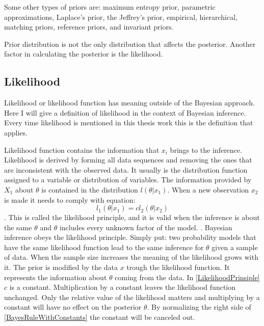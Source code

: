 Some other types of priors are: maximum entropy prior, parametric approximations, Laplace’s prior, the Jeffrey's prior, empirical, hierarchical, matching priors, reference priors, and invariant priors. \cite{Robert2007TheBC}

Prior distribution is not the only distribution that affects the posterior. Another factor in calculating the posterior is the likelihood.

\subsection{Likelihood}\label{Likelihood}
Likelihood or likelihood function has meaning outside of the Bayesian approach. Here I will give a definition of likelihood in the context of Bayesian inference. Every time likelihood is mentioned in this thesis work this is the definition that applies. 

Likelihood function contains the information that $x_i$ brings to the inference. \cite{Robert2007TheBC} Likelihood is derived by forming all data sequences and removing the ones that are inconsistent with the observed data. It usually is the distribution function assigned to a variable or distribution of variables. \cite{Mcelreath2015StatisticalRA} The information provided by $X_1$ about $\theta$ is contained in the distribution $l(\theta|x_1)$. When a new observation $x_2$ is made it needs to comply with equation:
\begin{equation}\label{LikelihoodPrinsiple}
l_1(\theta|x_1) = cl_2(\theta|x_2)
\end{equation}
\cite{Robert2007TheBC}. This is called the likelihood principle, and it is valid when the inference is about the same $\theta$ and $\theta$ includes every unknown factor of the model. \cite{Robert2007TheBC}. Bayesian inference obeys the likelihood principle. Simply put: two probability models that have the same likelihood function lead to the same inference for $\theta$ given a sample of data.\cite{Gel2014BayesianDA}
When the sample size increases the meaning of the likelihood grows with it. \cite{Mcelreath2015StatisticalRA} The prior is modified by the data $x$ trough the likelihood function. It represents the information about $\theta$ coming from the data. In \ref{LikelihoodPrinsiple} $c$ is a constant. Multiplication by a constant leaves the likelihood function unchanged. Only the relative value of the likelihood matters and multiplying by a constant will have no effect on the posterior $\theta$. By normalizing the right side of \ref{BayesRuleWithConstants} the constant will be canceled out.\cite{Box1973BayesianII}
 
